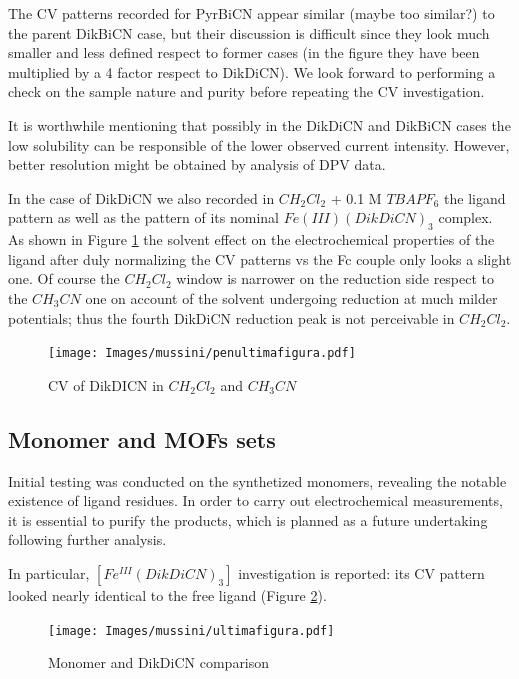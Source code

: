 \documentclass[../Master.tex]{subfiles}
\begin{document}
The CV patterns recorded for PyrBiCN appear similar (maybe too similar?) to the parent DikBiCN case, but their discussion is difficult since they look much smaller and less defined respect to former cases (in the figure they have been multiplied by a 4 factor respect to DikDiCN). We look forward to performing a check on the sample nature and purity before repeating the CV investigation.

It is worthwhile mentioning that possibly in the DikDiCN and DikBiCN cases the low solubility can be responsible of the lower observed current intensity. However, better resolution might be obtained by analysis of DPV data.

In the case of DikDiCN we also recorded in \(CH_{2}Cl_{2}\) + 0.1 M \(TBAPF_{6}\) the ligand pattern as well as the pattern of its nominal \(Fe(III)(DikDiCN)_{3}\) complex.  As shown in Figure \ref{fig:CVDikDICN} the solvent effect on the electrochemical properties of the ligand after duly normalizing the CV patterns vs the Fc couple only looks a slight one. Of course the \(CH_{2}Cl_{2}\) window is narrower on the reduction side respect to the \(CH_{3}CN\) one on account of the solvent undergoing reduction at much milder potentials; thus the fourth DikDiCN reduction peak is not perceivable in \(CH_{2}Cl_{2}\).

\begin{figure}[h!]
	\centering
	\texttt{[image: Images/mussini/penultimafigura.pdf]}
	\caption{CV of DikDICN in \(CH_{2}Cl_{2}\)  and \(CH_{3}CN\)}\label{fig:CVDikDICN}
\end{figure}
\newpage

\subsection{Monomer and MOFs sets}\label{sec:mofmon}

Initial testing was conducted on the synthetized monomers, revealing the notable existence of ligand residues. In order to carry out electrochemical measurements, it is essential to purify the products, which is planned as a future undertaking following further analysis.

In particular, \([ Fe^{III}(DikDiCN)_{3} ]\) investigation is reported: its CV pattern looked nearly identical to the free ligand (Figure \ref{fig:feCV}).

\begin{figure}[h!]
	\centering
	\texttt{[image: Images/mussini/ultimafigura.pdf]}
	\caption{Monomer and DikDiCN comparison}\label{fig:feCV}
\end{figure}
\end{document}
